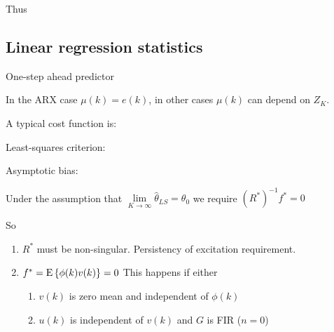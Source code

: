 \documentclass[10pt,a4paper]{scrartcl}
\begin{document}
\begin{multicols*}{2}

Thus


\subsection{Linear regression statistics}

One-step ahead predictor


In the ARX case $\mu(k)=e(k)$, in other cases $\mu(k)$ can depend on $Z_K$.


A typical cost function is:


Least-squares criterion:


Asymptotic bias:



Under the assumption that $\lim\limits_{K\rightarrow\infty}\hat{\theta}_{LS}=\theta_0$ we require $(R^\ast)^{-1}f^\ast=0$

So

\begin{enumerate}
\item $R^\ast$ must be non-singular. Persistency of excitation requirement.
\item $f^\ast=\text{E}\left\{\phi(k)v(k)\right\}=0$ This happens if either
\begin{enumerate}
\item $v(k)$ is zero mean and independent of $\phi(k)$
\item $u(k)$ is independent of $v(k)$ and $G$ is FIR ($n=0$)
\end{enumerate}
\end{enumerate}


\end{multicols*}
\end{document}
